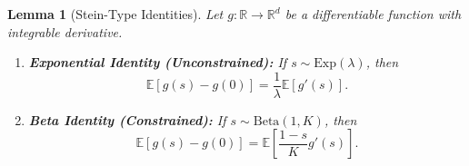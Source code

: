 \documentclass{article}
\theoremstyle{plain}
\newtheorem{lemma}[theorem]{Lemma}
\theoremstyle{definition}
\theoremstyle{remark}
\begin{document}
\begin{lemma}[Stein-Type Identities]
\label{lemma:stein_proof}
Let $g: \mathbb{R} \to \mathbb{R}^d$ be a differentiable function with integrable derivative.
\begin{enumerate}
    \item \textbf{Exponential Identity (Unconstrained):} If $s \sim \mathrm{Exp}(\lambda)$, then
    \begin{equation}
        \mathbb{E}[g(s) - g(0)] = \frac{1}{\lambda} \mathbb{E}[g'(s)].
    \end{equation}
    \item \textbf{Beta Identity (Constrained):} If $s \sim \mathrm{Beta}(1, K)$, then
    \begin{equation}
        \mathbb{E}[g(s) - g(0)] = \mathbb{E}\left[\frac{1-s}{K} g'(s)\right].
    \end{equation}
\end{enumerate}
\end{lemma}
\end{document}
